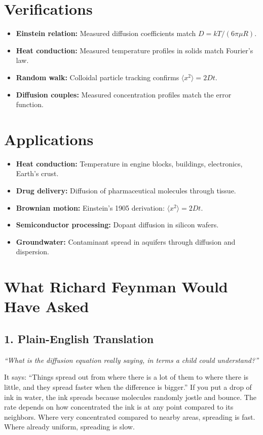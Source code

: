 \section*{Verifications}

\begin{itemize}
\item \textbf{Einstein relation:} Measured diffusion coefficients match $D = kT/(6\pi\mu R)$.
\item \textbf{Heat conduction:} Measured temperature profiles in solids match Fourier's law.
\item \textbf{Random walk:} Colloidal particle tracking confirms $\langle x^2 \rangle = 2Dt$.
\item \textbf{Diffusion couples:} Measured concentration profiles match the error function.
\end{itemize}
\section*{Applications}

\begin{itemize}
\item \textbf{Heat conduction:} Temperature in engine blocks, buildings, electronics, Earth's crust.
\item \textbf{Drug delivery:} Diffusion of pharmaceutical molecules through tissue.
\item \textbf{Brownian motion:} Einstein's 1905 derivation: $\langle x^2 \rangle = 2Dt$.
\item \textbf{Semiconductor processing:} Dopant diffusion in silicon wafers.
\item \textbf{Groundwater:} Contaminant spread in aquifers through diffusion and dispersion.
\end{itemize}
\section*{What Richard Feynman Would Have Asked}

\subsection*{1. Plain-English Translation}
\textit{``What is the diffusion equation really saying, in terms a child could understand?''}

It says: ``Things spread out from where there is a lot of them to where there is little, and they spread faster when the difference is bigger.'' If you put a drop of ink in water, the ink spreads because molecules randomly jostle and bounce. The rate depends on how concentrated the ink is at any point compared to its neighbors. Where very concentrated compared to nearby areas, spreading is fast. Where already uniform, spreading is slow.

